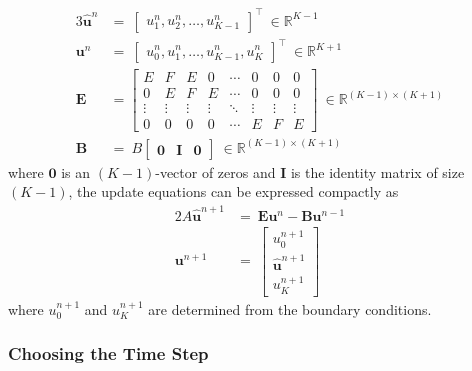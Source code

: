 \documentclass{article}
\begin{document}
\begin{alignat}{3}
   \hat{\mathbf{u}}^{n} &=\
   \begin{bmatrix}
      u_{1}^{n}, u_{2}^{n}, \ldots, u_{K-1}^{n}
   \end{bmatrix}^{\intercal}\ \in \mathbb{R}^{K-1} \nonumber \\
   \mathbf{u}^{n} &=\
   \begin{bmatrix}
      u_{0}^{n}, u_{1}^{n}, \ldots, u_{K-1}^{n}, u_{K}^{n}
   \end{bmatrix}^{\intercal}\ \in \mathbb{R}^{K+1} \nonumber \\
   \label{eqn: E matrix}
   \mathbf{E} &=
   \begin{bmatrix}
      E & F & E & 0 & \cdots & 0 & 0 & 0 \\
      0 & E & F & E & \cdots & 0 & 0 & 0 \\
      \vdots & \vdots & \vdots & \vdots & \ddots & \vdots & \vdots & \vdots \\
      0 & 0 & 0 & 0 & \cdots & E & F & E
   \end{bmatrix}\ \in \mathbb{R}^{\left(K-1\right) \times \left(K+1\right)} \\
   \label{eqn: B matrix}
   \mathbf{B} &=\
   B
   \begin{bmatrix}
      \mathbf{0} & \mathbf{I} & \mathbf{0}
   \end{bmatrix}\ \in \mathbb{R}^{\left(K-1\right) \times \left(K+1\right)}
\end{alignat}
where $\mathbf{0}$ is an $\left(K-1\right)$-vector of zeros and
$\mathbf{I}$ is the identity matrix of size $\left(K-1\right)$,
the update equations can be expressed compactly as
\begin{alignat}{2}
   \label{eqn: Difference eqn vectorized Pt. 1}
   A \hat{\mathbf{u}}^{n+1} &=\ \mathbf{E} \mathbf{u}^{n} - \mathbf{B} \mathbf{u}^{n-1} \\
   \label{eqn: Difference eqn vectorized Pt. 2}
   \mathbf{u}^{n+1} &=\ 
   \begin{bmatrix}
      u_{0}^{n+1} \\
      \hat{\mathbf{u}}^{n+1} \\
      u_{K}^{n+1}
   \end{bmatrix}
\end{alignat}
where $u_{0}^{n+1}$ and $u_{K}^{n+1}$ are determined from the boundary conditions.

\subsubsection{Choosing the Time Step}
\label{subsubsec: Choosing the Time Step}
\end{document}
